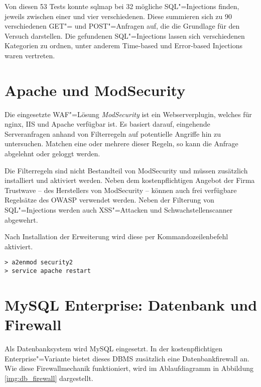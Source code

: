 Von diesen 53 Tests konnte sqlmap bei 32 mögliche SQL"=Injections finden, jeweils zwischen einer und vier verschiedenen. Diese summieren sich zu 90 verschiedenen GET"= und POST"=Anfragen auf, die die Grundlage für den Versuch darstellen. Die gefundenen SQL"=Injections lassen sich verschiedenen Kategorien zu ordnen, unter anderem Time-based und Error-based Injections waren vertreten.

\section{Apache und ModSecurity}

Die eingesetzte WAF"=Lösung \emph{ModSecurity} ist ein Webserverplugin, welches für nginx, IIS und Apache verfügbar ist. Es basiert darauf, eingehende Serveranfragen anhand von Filterregeln auf potentielle Angriffe hin zu untersuchen. Matchen eine oder mehrere dieser Regeln, so kann die Anfrage abgelehnt oder geloggt werden.

Die Filterregeln sind nicht Bestandteil von ModSecurity und müssen zusätzlich installiert und aktiviert werden. Neben dem kostenpflichtigen Angebot der Firma Trustwave -- des Herstellers von ModSecurity -- können auch frei verfügbare Regelsätze des OWASP verwendet werden. Neben der Filterung von SQL"=Injections werden auch XSS"=Attacken und Schwachstellenscanner abgewehrt.

Nach Installation der Erweiterung wird diese per Kommandozeilenbefehl aktiviert.

\begin{listing}[ht!]
\begin{verbatim}
> a2enmod security2
> service apache restart
\end{verbatim}
\end{listing}


\section{MySQL Enterprise: Datenbank und Firewall}

Als Datenbanksystem wird MySQL eingesetzt. In der kostenpflichtigen Enterprise"=Variante bietet dieses DBMS zusätzlich eine Datenbankfirewall an. Wie diese Firewallmechanik funktioniert, wird im Ablaufdiagramm in Abbildung \ref{img:db_firewall} dargestellt.

